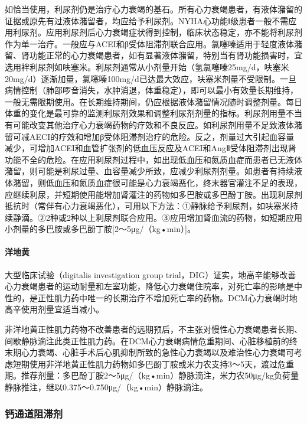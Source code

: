 如恰当使用，利尿剂仍是治疗心力衰竭的基石。所有心力衰竭患者，有液体潴留的证据或原先有过液体潴留者，均应给予利尿剂。NYHA心功能Ⅰ级患者一般不需应用利尿剂。应用利尿剂后心力衰竭症状得到控制，临床状态稳定，亦不能将利尿剂作为单一治疗。一般应与ACEI和β受体阻滞剂联合应用。氯噻嗪适用于轻度液体潴留、肾功能正常的心力衰竭患者，如有显著液体潴留，特别当有肾功能损害时，宜选用袢利尿剂如呋塞米。利尿剂通常从小剂量开始（氢氯噻嗪25mg/d，呋塞米20mg/d）逐渐加量，氯噻嗪100mg/d已达最大效应，呋塞米剂量不受限制。一旦病情控制（肺部啰音消失，水肿消退，体重稳定），即可以最小有效量长期维持，一般无需限期使用。在长期维持期间，仍应根据液体潴留情况随时调整剂量。每日体重的变化是最可靠的监测利尿剂效果和调整利尿剂剂量的指标。利尿剂用量不当有可能改变其他治疗心力衰竭药物的疗效和不良反应。如利尿剂用量不足致液体潴留可减AECI的疗效和增加β受体阻滞剂治疗的危险。反之，剂量过大引起血容量减少，可增加ACEI和血管扩张剂的低血压反应及ACEI和AngⅡ受体阻滞剂出现肾功能不全的危险。在应用利尿剂过程中，如出现低血压和氮质血症而患者已无液体潴留，则可能是利尿过量、血容量减少所致，应减少利尿剂剂量。如患者有持续液体潴留，则低血压和氮质血症很可能是心力衰竭恶化，终末器官灌注不足的表现，应继续利尿，并短期使用能增加肾灌注的药物如多巴胺或多巴酚丁胺。出现利尿剂抵抗时（常伴有心力衰竭恶化），可用以下方法：①静脉给予利尿剂，如呋塞米持续静滴。②2种或2种以上利尿剂联合应用。③应用增加肾血流的药物，如短期应用小剂量的多巴胺或多巴酚丁胺{[}2～5μg/（kg•min）{]}。

\paragraph{洋地黄}

大型临床试验（digitalis investigation group
trial，DIG）证实，地高辛能够改善心力衰竭患者的运动耐量和左室功能，降低心力衰竭住院率，对死亡率的影响是中性的，是正性肌力药中唯一的长期治疗不增加死亡率的药物。DCM心力衰竭时地高辛使用剂量宜适当减小。

非洋地黄正性肌力药物不改善患者的远期预后，不主张对慢性心力衰竭患者长期、间歇静脉滴注此类正性肌力药。在DCM心力衰竭病情危重期间、心脏移植前的终末期心力衰竭、心脏手术后心肌抑制所致的急性心力衰竭以及难治性心力衰竭可考虑短期使用非洋地黄正性肌力药物如多巴酚丁胺或米力农支持3～5天，渡过危重期。推荐剂量：多巴酚丁胺2～5μg/（kg•min）静脉滴注，米力农50μg/kg负荷量静脉推注，继以0.375～0.750μg/（kg•min）静脉滴注。

\subsubsection{钙通道阻滞剂}

